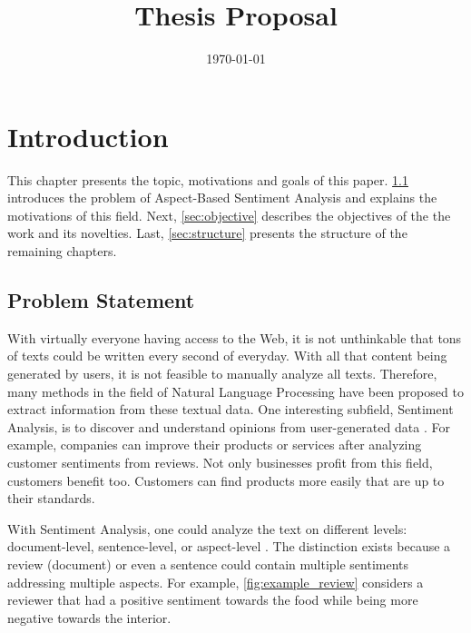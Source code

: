 \documentclass[american, oneside]{ecsgdp}
\begin{document}
\frontmatter
\title{Thesis Proposal}
\addresses{\groupname\\\deptname\\\univname}
\date{\today}

% 

\maketitle

\tableofcontents

\mainmatter
\chapter{Introduction} \label{chap:introduction}
This chapter presents the topic, motivations and goals of this paper. \cref{sec:problem} introduces the problem of Aspect-Based Sentiment Analysis and explains the motivations of this field. Next, \cref{sec:objective} describes the objectives of the the work and its novelties. Last, \cref{sec:structure} presents the structure of the remaining chapters. %

\section{Problem Statement} \label{sec:problem}
With virtually everyone having access to the Web, it is not unthinkable that tons of texts could be written every second of everyday. With all that content being generated by users, it is not feasible to manually analyze all texts. Therefore, many methods in the field of Natural Language Processing have been proposed to extract information from these textual data. One interesting subfield, Sentiment Analysis, is to discover and understand opinions from user-generated data \parencite{Liu2012SAOP}. For example, companies can improve their products or services after analyzing customer sentiments from reviews. Not only businesses profit from this field, customers benefit too. Customers can find products more easily that are up to their standards.

With Sentiment Analysis, one could analyze the text on different levels: document-level, sentence-level, or aspect-level \parencite{Liu2012SAOP}. The distinction exists because a review (document) or even a sentence could contain multiple sentiments addressing multiple aspects. For example, \cref{fig:example_review} considers a reviewer that had a positive sentiment towards the food while being more negative towards the interior.
\end{document}
